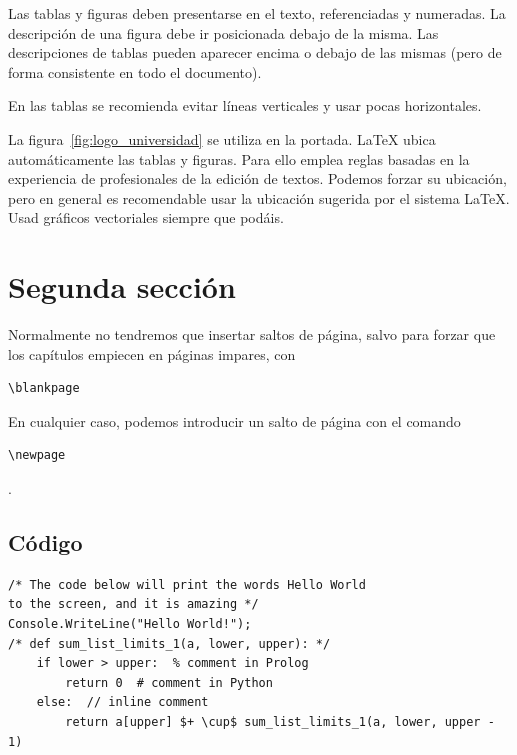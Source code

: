 \documentclass[twoside]{urjc-tfg}
\begin{document}
Las tablas y figuras deben presentarse en el texto, referenciadas y
numeradas. La descripción de una figura debe ir posicionada debajo de
la misma. Las descripciones de tablas pueden aparecer encima o debajo
de las mismas (pero de forma consistente en todo el documento).

En las tablas se recomienda evitar líneas verticales y usar pocas horizontales. 

La figura~\ref{fig:logo_universidad} se utiliza en la portada. \LaTeX
ubica automáticamente las tablas y figuras. Para ello emplea reglas
basadas en la experiencia de profesionales de la edición de
textos. Podemos forzar su ubicación, pero en general es recomendable
usar la ubicación sugerida por el sistema \LaTeX. Usad gráficos
vectoriales siempre que podáis.




\section{Segunda sección}

Normalmente no tendremos que insertar saltos de página, salvo para forzar que los capítulos empiecen en páginas impares, con \begin{verbatim}\blankpage\end{verbatim} En cualquier caso, podemos introducir un salto de página con el comando \begin{verbatim}\newpage\end{verbatim}.

\newpage



\subsection{Código}

\begin{lstlisting}
/* The code below will print the words Hello World
to the screen, and it is amazing */
Console.WriteLine("Hello World!"); 
/* def sum_list_limits_1(a, lower, upper): */
    if lower > upper:  % comment in Prolog
        return 0  # comment in Python 
    else:  // inline comment
        return a[upper] $+ \cup$ sum_list_limits_1(a, lower, upper - 1)
\end{lstlisting}

\end{document}
